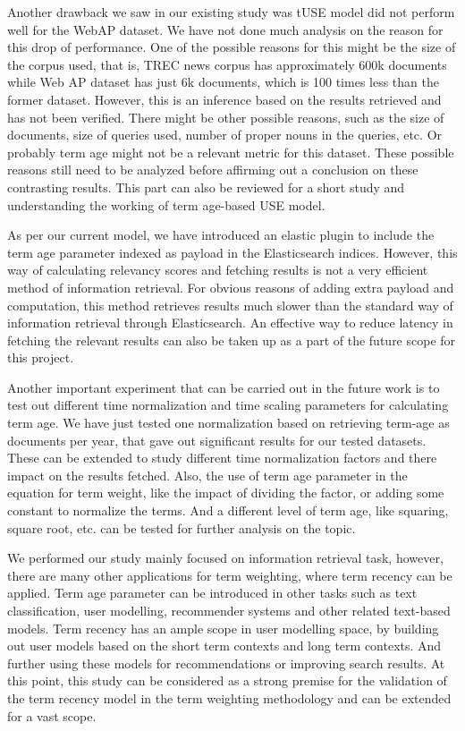 Another drawback we saw in our existing study was tUSE model did not perform well for the WebAP dataset. We have not done much analysis on the reason for this drop of performance. One of the possible reasons for this might be the size of the corpus used, that is, TREC news corpus has approximately 600k documents while Web AP dataset has just 6k documents, which is 100 times less than the former dataset. However, this is an inference based on the results retrieved and has not been verified. There might be other possible reasons, such as the size of documents, size of queries used, number of proper nouns in the queries, etc. Or probably term age might not be a relevant metric for this dataset. These possible reasons still need to be analyzed before affirming out a conclusion on these contrasting results. This part can also be reviewed for a short study and understanding the working of term age-based USE model.

As per our current model, we have introduced an elastic plugin to include the term age parameter indexed as payload in the Elasticsearch indices. However, this way of calculating relevancy scores and fetching results is not a very efficient method of information retrieval. For obvious reasons of adding extra payload and computation, this method retrieves results much slower than the standard way of information retrieval through Elasticsearch. An effective way to reduce latency in fetching the relevant results can also be taken up as a part of the future scope for this project.


Another important experiment that can be carried out in the future work is to test out different time normalization and time scaling parameters for calculating term age. We have just tested one normalization based on retrieving term-age as documents per year, that gave out significant results for our tested datasets. These can be extended to study different time normalization factors and there impact on the results fetched. Also, the use of term age parameter in the equation for term weight, like the impact of dividing the factor, or adding some constant to normalize the terms. And a different level of term age, like squaring, square root, etc. can be tested for further analysis on the topic.


We performed our study mainly focused on information retrieval task, however, there are many other applications for term weighting, where term recency can be applied. Term age parameter can be introduced in other tasks such as text classification, user modelling, recommender systems and other related text-based models. Term recency has an ample scope in user modelling space, by building out user models based on the short term contexts and long term contexts. And further using these models for recommendations or improving search results. At this point, this study can be considered as a strong premise for the validation of the term recency model in the term weighting methodology and can be extended for a vast scope.


